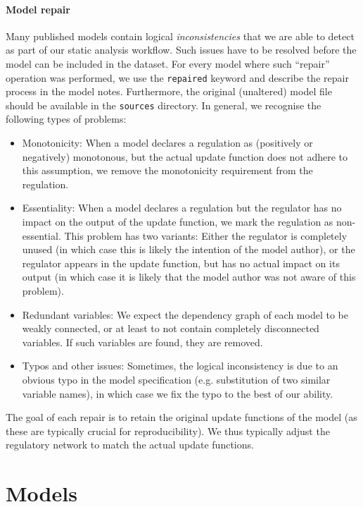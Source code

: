 \documentclass{article}
\begin{document}
\paragraph{Model repair} Many published models contain logical \emph{inconsistencies} that we are able to detect as part of our static analysis workflow. Such issues have to be resolved before the model can be included in the dataset. For every model where such ``repair'' operation was performed, we use the \texttt{repaired} keyword and describe the repair process in the model notes. Furthermore, the original (unaltered) model file should be available in the \texttt{sources} directory. In general, we recognise the following types of problems:

\begin{itemize}
	\item Monotonicity: When a model declares a regulation as (positively or negatively) monotonous, but the actual update function does not adhere to this assumption, we remove the monotonicity requirement from the regulation.
	\item Essentiality: When a model declares a regulation but the regulator has no impact on the output of the update function, we mark the regulation as non-essential. This problem has two variants: Either the regulator is completely unused (in which case this is likely the intention of the model author), or the regulator appears in the update function, but has no actual impact on its output (in which case it is likely that the model author was not aware of this problem).
	\item Redundant variables: We expect the dependency graph of each model to be weakly connected, or at least to not contain completely disconnected variables. If such variables are found, they are removed.
	\item Typos and other issues: Sometimes, the logical inconsistency is due to an obvious typo in the model specification (e.g. substitution of two similar variable names), in which case we fix the typo to the best of our ability.
\end{itemize}

The goal of each repair is to retain the original update functions of the model (as these are typically crucial for reproducibility). We thus typically adjust the regulatory network to match the actual update functions.

\section{Models}
\end{document}

